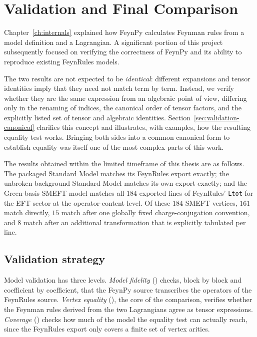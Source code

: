 
\chapter{Validation and Final Comparison}
\label{ch:validation}

Chapter~\ref{ch:internals} explained how FeynPy calculates Feynman rules from a model definition and a Lagrangian. A significant portion of this project subsequently focused on verifying the correctness of FeynPy and its ability to reproduce existing FeynRules models.

The two results are not expected to be \emph{identical}: different expansions and tensor identities imply that they need not match term by term. Instead, we verify whether they are the same expression from an algebraic point of view, differing only in the renaming of indices, the canonical order of tensor factors, and the explicitly listed set of tensor and algebraic identities. Section~\ref{sec:validation-canonical} clarifies this concept and illustrates, with examples, how the resulting equality test works. Bringing both sides into a common canonical form to establish equality was itself one of the most complex parts of this work.

The results obtained within the limited timeframe of this thesis are as follows. The packaged Standard Model matches its FeynRules export exactly; the unbroken background Standard Model matches its own export exactly; and the Green-basis SMEFT model matches all $184$ exported lines of FeynRules' \texttt{Ltot} for the EFT sector at the operator-content level. Of these $184$ SMEFT vertices, $161$ match directly, $15$ match after one globally fixed charge-conjugation convention, and $8$ match after an additional transformation that is explicitly tabulated per line.

\section{Validation strategy}
\label{sec:validation-strategy}
Model validation has three levels. \emph{Model fidelity} () checks, block by block and coefficient by coefficient, that the FeynPy source transcribes the operators of the FeynRules source. \emph{Vertex equality} (), the core of the comparison, verifies whether the Feynman rules derived from the two Lagrangians agree as tensor expressions. \emph{Coverage} () checks how much of the model the equality test can actually reach, since the FeynRules export only covers a finite set of vertex arities.

